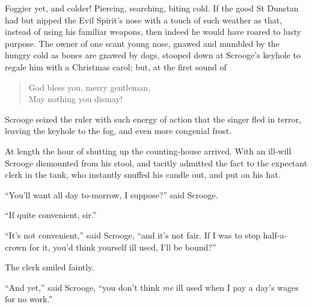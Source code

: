 \documentclass[paper=5.5in:8.5in,BCOR=5mm,twoside,DIV=calc,12pt,usegeometry]{scrbook} %
\begin{document}
Foggier yet, and colder! Piercing, searching, biting cold. If the good St Dunstan had but nipped the Evil Spirit's nose with a touch of such weather as that, instead of using his familiar weapons, then indeed he would have roared to lusty purpose. The owner of one scant young nose, gnawed and mumbled by the hungry cold as bones are gnawed by dogs, stooped down at Scrooge's keyhole to regale him with a Christmas carol; but, at the first sound of 
\blockquote{God bless you, merry gentleman,\\
May nothing you dismay!}

Scrooge seized the ruler with such energy of action that the singer fled in terror, leaving the keyhole to the fog, and even more congenial frost.

At length the hour of shutting up the counting-house arrived. With an ill-will Scrooge dismounted from his stool, and tacitly admitted the fact to the expectant clerk in the tank, who instantly snuffed his candle out, and put on his hat.

\enquote{You'll want all day to-morrow, I suppose?} said Scrooge.

\enquote{If quite convenient, sir.}

\enquote{It's not convenient,} said Scrooge, \enquote{and it's not fair. If I was to stop half-a-crown for it, you'd think yourself ill used, I'll be bound?}

The clerk smiled faintly.

\enquote{And yet,} said Scrooge, \enquote{you don't think \textit{me} ill used when I pay a day's wages for no work.}
\end{document}
